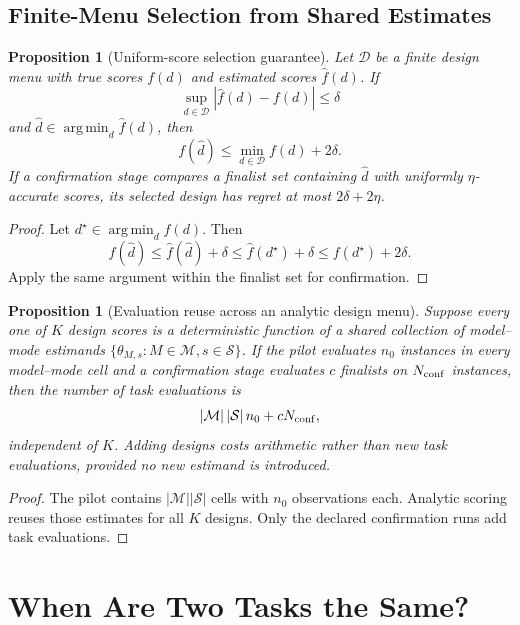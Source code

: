 \documentclass[10pt]{article}
\DeclareMathOperator*{\argmin}{arg\,min}
\theoremstyle{paperplain}
\newtheorem{proposition}[theorem]{Proposition}
\theoremstyle{paperdefinition}
\theoremstyle{paperremark}
\begin{document}
\subsection{Finite-Menu Selection from Shared Estimates}

\begin{proposition}[Uniform-score selection guarantee]
\label{prop:uniform-score-selection}
Let \(\mathcal D\) be a finite design menu with true scores \(f(d)\) and
estimated scores \(\widehat f(d)\).  If
\[
  \sup_{d\in\mathcal D}|\widehat f(d)-f(d)|\le\delta
\]
and \(\widehat d\in\argmin_d\widehat f(d)\), then
\[
  f(\widehat d)\le\min_{d\in\mathcal D}f(d)+2\delta.
\]
If a confirmation stage compares a finalist set containing \(\widehat d\)
with uniformly \(\eta\)-accurate scores, its selected design has regret at
most \(2\delta+2\eta\).
\end{proposition}

\begin{proof}
Let \(d^\star\in\argmin_d f(d)\).  Then
\[
  f(\widehat d)
  \le\widehat f(\widehat d)+\delta
  \le\widehat f(d^\star)+\delta
  \le f(d^\star)+2\delta.
\]
Apply the same argument within the finalist set for confirmation.
\end{proof}

\begin{proposition}[Evaluation reuse across an analytic design menu]
\label{prop:evaluation-reuse}
Suppose every one of \(K\) design scores is a deterministic function of a
shared collection of model--mode estimands
\(\{\theta_{M,s}:M\in\mathcal M,s\in\mathcal S\}\).
If the pilot evaluates \(n_0\) instances in every model--mode cell and a
confirmation stage evaluates \(c\) finalists on \(N_{\rm conf}\) instances,
then the number of task evaluations is
\[
  |\mathcal M|\,|\mathcal S|\,n_0+cN_{\rm conf},
\]
independent of \(K\).  Adding designs costs arithmetic rather than new task
evaluations, provided no new estimand is introduced.
\end{proposition}

\begin{proof}
The pilot contains
\(|\mathcal M||\mathcal S|\) cells with \(n_0\) observations each.
Analytic scoring reuses those estimates for all \(K\) designs.  Only the
declared confirmation runs add task evaluations.
\end{proof}

\section{When Are Two Tasks the Same?}
\label{sec:equivalence}
\end{document}
